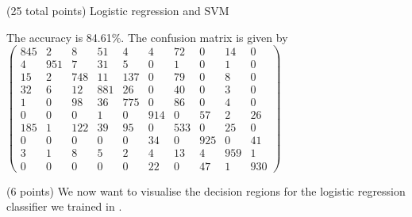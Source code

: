 \documentclass[12pt]{article}
\begin{document}
\begin{question}{(25 total points) Logistic regression and SVM}
\begin{subquestion}
   

      \begin{answerbox}{30em}
         The accuracy is 84.61\%. The confusion matrix is given by
\\$\begin{pmatrix} 845 & 2 & 8 & 51 & 4 & 4 & 72 & 0 & 14 & 0\\
						 4 & 951 & 7 & 31 & 5 & 0 & 1 & 0 & 1 & 0\\
						 15 & 2 & 748 & 11 & 137 & 0 & 79 & 0 & 8 & 0\\
						 32 & 6 & 12 & 881 & 26 & 0 & 40 & 0 & 3 & 0\\
						 1 & 0 & 98 & 36 & 775 & 0 & 86 & 0 & 4 & 0\\
						 0 & 0 & 0 & 1 & 0 & 914 & 0 & 57 & 2 & 26\\
						 185 & 1 & 122 & 39 & 95 & 0 & 533 & 0 & 25 & 0\\
						 0 & 0 & 0 & 0 & 0 & 34 & 0 & 925 & 0 & 41\\
						 3 & 1 & 8 & 5 & 2 & 4 & 13 & 4 & 959 & 1\\
						 0 & 0 & 0 & 0 & 0 & 22 & 0 & 47 & 1 & 930\end{pmatrix}$
      \end{answerbox}
  


   \end{subquestion}
   \begin{subquestion}{(6 points)
       We now want to visualise the decision regions for the logistic
       regression classifier we trained in .
     } \label{Q2.3}


   

  



\end{subquestion}
\end{question}
\end{document}
